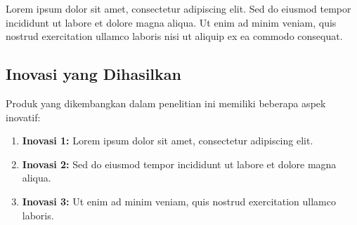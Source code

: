 
Lorem ipsum dolor sit amet, consectetur adipiscing elit. Sed do eiusmod tempor incididunt ut labore et dolore magna aliqua. Ut enim ad minim veniam, quis nostrud exercitation ullamco laboris nisi ut aliquip ex ea commodo consequat.

\subsection{Inovasi yang Dihasilkan}


Produk yang dikembangkan dalam penelitian ini memiliki beberapa aspek inovatif:

\begin{enumerate}
    \item \textbf{Inovasi 1:} Lorem ipsum dolor sit amet, consectetur adipiscing elit.
    \item \textbf{Inovasi 2:} Sed do eiusmod tempor incididunt ut labore et dolore magna aliqua.
    \item \textbf{Inovasi 3:} Ut enim ad minim veniam, quis nostrud exercitation ullamco laboris.
\end{enumerate}
